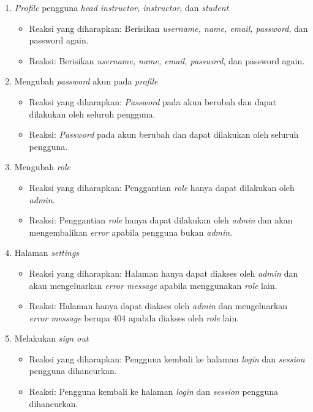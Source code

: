 \begin{enumerate}
\begin{itemize}
	 \end{itemize}
	 \item \textit{Profile} pengguna \textit{head instructor, instructor}, dan \textit{student}
	 \begin{itemize}
	 	\item Reaksi yang diharapkan: Berisikan \textit{username, name, email, password}, dan password again.
	 	\item Reaksi: Berisikan \textit{username, name, email, password}, dan password again.
	 \end{itemize}
	 \item Mengubah \textit{password} akun pada \textit{profile}
	 \begin{itemize}
	 	\item Reaksi yang diharapkan: \textit{Password} pada akun berubah dan dapat dilakukan oleh seluruh pengguna.
	 	\item Reaksi: \textit{Password} pada akun berubah dan dapat dilakukan oleh seluruh pengguna.
	 \end{itemize}
	 \item Mengubah \textit{role}
	 \begin{itemize}
	 	\item Reaksi yang diharapkan: Penggantian \textit{role} hanya dapat dilakukan oleh \textit{admin}.
	 	\item Reaksi: Penggantian \textit{role} hanya dapat dilakukan oleh \textit{admin} dan akan mengembalikan \textit{error} apabila pengguna bukan \textit{admin}.
	 \end{itemize}
	 \item Halaman \textit{settings}
	 \begin{itemize}
	 	\item Reaksi yang diharapkan: Halaman hanya dapat diakses oleh \textit{admin} dan akan mengeluarkan \textit{error message} apabila menggunakan \textit{role} lain.
	 	\item Reaksi: Halaman hanya dapat diakses oleh \textit{admin} dan mengeluarkan \textit{error message} berupa 404 apabila diakses oleh \textit{role} lain.
	 \end{itemize}
	 \item Melakukan \textit{sign out}
	 \begin{itemize}
	 	\item Reaksi yang diharapkan: Pengguna kembali ke halaman \textit{login} dan \textit{session} pengguna dihancurkan.
	 	\item Reaksi: Pengguna kembali ke halaman \textit{login} dan \textit{session} pengguna dihancurkan.

\end{itemize}
\end{enumerate}
